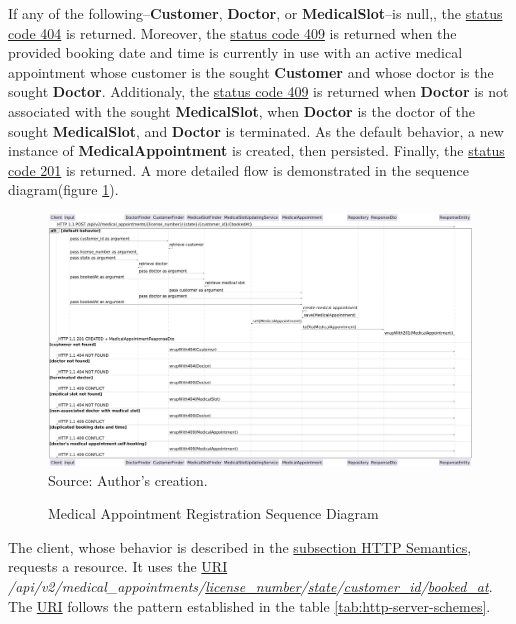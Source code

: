 If any of the following--\textbf{Customer}, \textbf{Doctor}, or \textbf{MedicalSlot}--is null,, the \hyperref[tab:summary_http_status_codes]{status code 404} is returned.
Moreover, the \hyperref[tab:summary_http_status_codes]{status code 409} is returned when the provided booking date and time is currently in use with an active medical appointment whose customer is the sought \textbf{Customer} and whose doctor is the sought \textbf{Doctor}. Additionaly,  the \hyperref[tab:summary_http_status_codes]{status code 409} is returned when \textbf{Doctor} is not associated with the sought \textbf{MedicalSlot}, when \textbf{Doctor} is the doctor of the sought \textbf{MedicalSlot}, and \textbf{Doctor} is terminated. As the default behavior, a new instance of \textbf{MedicalAppointment} is created, then persisted. Finally, the \hyperref[tab:summary_http_status_codes]{status code 201} is returned. A more detailed flow is demonstrated in the sequence diagram(figure \ref{fig:medical_appointment_registration_sequence_diagram}).

\begin{landscape}
	\begin{figure}[H]
		\centering
		\caption{Medical Appointment Registration Sequence Diagram}
		\includegraphics[width=0.99\linewidth]{figures/medical_appointment_registration_sequence_diagram}
		\\ \footnotesize Source: Author's creation.
		\label{fig:medical_appointment_registration_sequence_diagram}
	\end{figure}
\end{landscape}

The client, whose behavior is described in the \hyperref[subsection:http_semantics]{subsection HTTP Semantics}, requests a resource. It uses the \hyperref[appendix:glossary]{URI} \textit{/api/v2/medical\_appointments/\underline{license\_number}/\underline{state}/\underline{customer\_id}/\underline{booked\_at}}. The \hyperref[appendix:glossary]{URI} follows the pattern established  in the table \ref{tab:http-server-schemes}.

